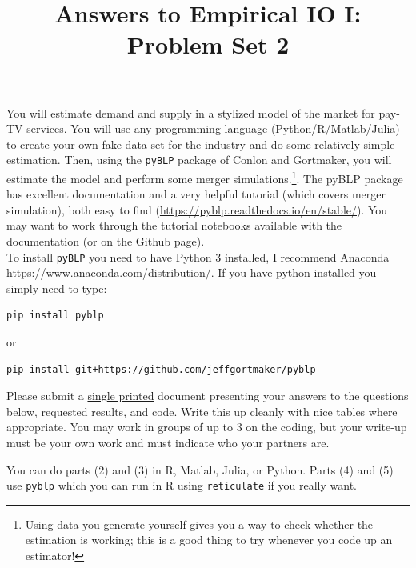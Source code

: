 \documentclass{article}
\title{Answers to Empirical IO I: Problem Set 2}
\author{}
\date{}
\begin{document}
\maketitle

\begin{tcolorbox}
You will estimate demand and supply in a stylized model of the market for
pay-TV services. You will use any programming language (Python/R/Matlab/Julia) to create your own fake data set for the industry and do some
relatively simple estimation. Then, using the \texttt{pyBLP} package of Conlon and Gortmaker, you will
estimate the model and perform some merger simulations.\footnote{%
Using data you generate yourself gives you a way to check whether the
estimation is working; this is a good thing to try whenever you code up an
estimator!}. The pyBLP package has excellent
documentation and a very helpful tutorial (which covers merger simulation),
both easy to find (\url{https://pyblp.readthedocs.io/en/stable/}). You may want to work through the tutorial notebooks available with the documentation (or on the Github page).\\

To install \texttt{pyBLP} you need to have Python 3 installed, I recommend Anaconda \url{https://www.anaconda.com/distribution/}. If you have python installed you simply need to type:
\begin{verbatim}
pip install pyblp
\end{verbatim}
or 
\begin{verbatim}
pip install git+https://github.com/jeffgortmaker/pyblp
\end{verbatim}

Please submit a \underline{single printed} document presenting your answers to the questions below,
requested results, and code. Write this up cleanly with nice tables where appropriate.
You may work in groups of up to 3 on the coding, but your write-up must be your own work and must indicate who your partners are.

You can do parts (2) and (3) in R, Matlab, Julia, or Python. Parts (4) and (5) use \texttt{pyblp} which you can run in R using \texttt{reticulate} if you really want.
\end{tcolorbox}
\end{document}
